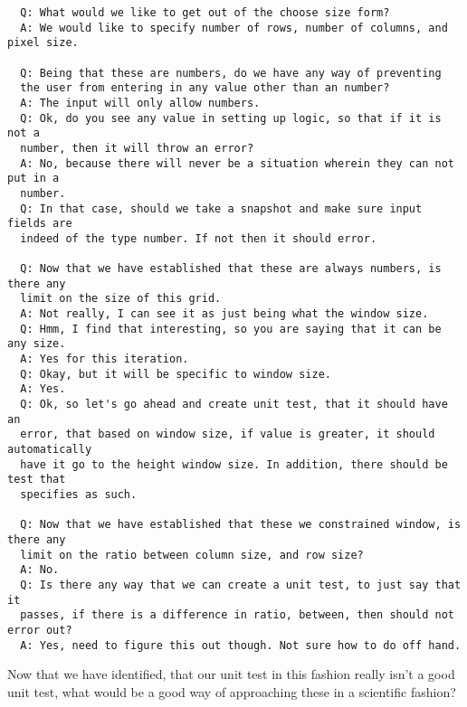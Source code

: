 \begin{verbatim}
  Q: What would we like to get out of the choose size form?
  A: We would like to specify number of rows, number of columns, and pixel size.

  Q: Being that these are numbers, do we have any way of preventing
  the user from entering in any value other than an number?
  A: The input will only allow numbers.
  Q: Ok, do you see any value in setting up logic, so that if it is not a
  number, then it will throw an error?
  A: No, because there will never be a situation wherein they can not put in a
  number.
  Q: In that case, should we take a snapshot and make sure input fields are
  indeed of the type number. If not then it should error.

  Q: Now that we have established that these are always numbers, is there any
  limit on the size of this grid.
  A: Not really, I can see it as just being what the window size.
  Q: Hmm, I find that interesting, so you are saying that it can be any size.
  A: Yes for this iteration.
  Q: Okay, but it will be specific to window size.
  A: Yes.
  Q: Ok, so let's go ahead and create unit test, that it should have an
  error, that based on window size, if value is greater, it should automatically
  have it go to the height window size. In addition, there should be test that
  specifies as such.

  Q: Now that we have established that these we constrained window, is there any
  limit on the ratio between column size, and row size?
  A: No.
  Q: Is there any way that we can create a unit test, to just say that it
  passes, if there is a difference in ratio, between, then should not error out?
  A: Yes, need to figure this out though. Not sure how to do off hand. 
\end{verbatim}


Now that we have identified, that our unit test in this fashion really isn't a
good unit test, what would be a good way of approaching these in a scientific
fashion?

